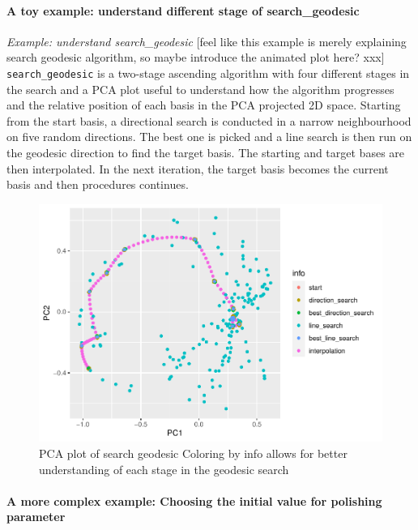 \documentclass[12pt]{article}
\begin{document}
\hypertarget{a-toy-example-understand-different-stage-of-search_geodesic}{%
\paragraph{A toy example: understand different stage of
search\_geodesic}\label{a-toy-example-understand-different-stage-of-search_geodesic}}

\emph{Example: understand search\_geodesic} {[}feel like this example is
merely explaining search geodesic algorithm, so maybe introduce the
animated plot here? xxx{]} \texttt{search\_geodesic} is a two-stage
ascending algorithm with four different stages in the search and a PCA
plot useful to understand how the algorithm progresses and the relative
position of each basis in the PCA projected 2D space. Starting from the
start basis, a directional search is conducted in a narrow neighbourhood
on five random directions. The best one is picked and a line search is
then run on the geodesic direction to find the target basis. The
starting and target bases are then interpolated. In the next iteration,
the target basis becomes the current basis and then procedures
continues.

\begin{figure}
\centering
\includegraphics{paper_files/figure-latex/pca-1.pdf}
\caption{\label{pca}PCA plot of search geodesic Coloring by info allows
for better understanding of each stage in the geodesic search}
\end{figure}

\hypertarget{a-more-complex-example-choosing-the-initial-value-for-polishing-parameter}{%
\paragraph{A more complex example: Choosing the initial value for
polishing
parameter}\label{a-more-complex-example-choosing-the-initial-value-for-polishing-parameter}}
\end{document}
